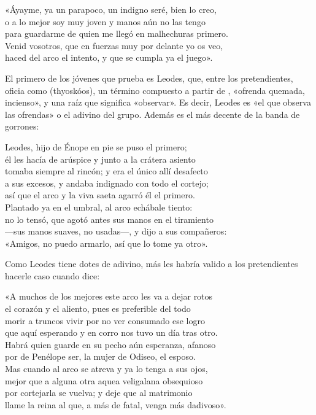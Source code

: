\begin{versocita}
«Áyayme, ya un parapoco, un indigno seré, bien lo creo,\\
o a lo mejor soy muy joven y manos aún no las tengo\\
para guardarme de quien me llegó en malhechuras primero.\\
Venid vosotros, que en fuerzas muy por delante yo os veo,\\
haced del arco el intento, y que se cumpla ya el juego».
\end{versocita}

El primero de los jóvenes que prueba es Leodes, que, entre los pretendientes, oficia como  (thyoskóos), un término compuesto a partir de , «ofrenda quemada, incienso», y una raíz que significa «observar». Es decir, Leodes es «el que observa las ofrendas» o el adivino del grupo. Además es el más decente de la banda de gorrones:

\begin{versocita}
Leodes, hijo de Énope en pie se puso el primero;\\
él les hacía de arúspice y junto a la crátera asiento\\
tomaba siempre al rincón; y era el único allí desafecto\\
a sus excesos, y andaba indignado con todo el cortejo;\\
así que el arco y la viva saeta agarró él el primero.\\
Plantado ya en el umbral, al arco echábale tiento:\\
no lo tensó, que agotó antes sus manos en el tiramiento\\
---sus manos suaves, no usadas---, y dijo a sus compañeros:\\
«Amigos, no puedo armarlo, así que lo tome ya otro».
\end{versocita}

Como Leodes tiene dotes de adivino, más les habría valido a los pretendientes hacerle caso cuando dice:

\begin{versocita}
«A muchos de los mejores este arco les va a dejar rotos\\
el corazón y el aliento, pues es preferible del todo\\
morir a truncos vivir por no ver consumado ese logro\\
que aquí esperando y en corro nos tuvo un día tras otro.\\
Habrá quien guarde en su pecho aún esperanza, afanoso\\
por de Penélope ser, la mujer de Odiseo, el esposo.\\
Mas cuando al arco se atreva y ya lo tenga a sus ojos,\\
mejor que a alguna otra aquea veligalana obsequioso\\
por cortejarla se vuelva; y deje que al matrimonio\\
llame la reina al que, a más de fatal, venga más dadivoso».
\end{versocita}

